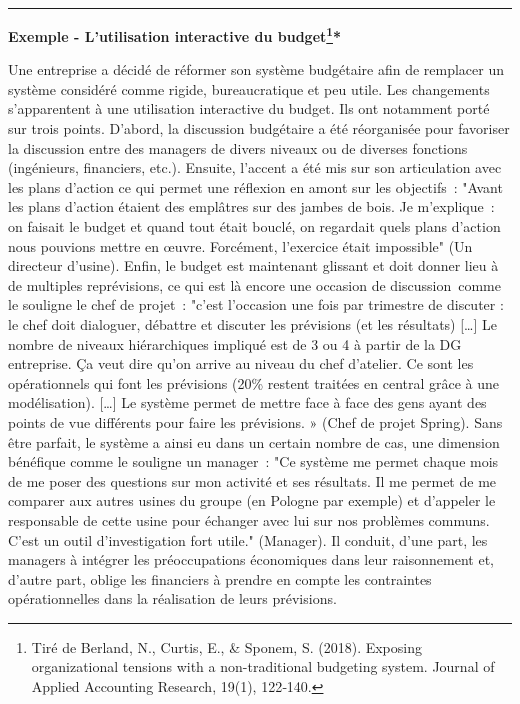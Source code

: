 \documentclass[oneside]{kaobook}
\begin{document}
\noindent\rule{\textwidth}{0.5pt}
\textbf{Exemple - L'utilisation interactive du budget\footnote{Tiré de Berland, N., Curtis, E., \& Sponem, S. (2018). Exposing organizational tensions with a non-traditional budgeting system. Journal of Applied Accounting Research, 19(1), 122‑140.}*}

Une entreprise a décidé de réformer son système budgétaire afin de remplacer un système considéré comme rigide, bureaucratique et peu utile. Les changements s'apparentent à une utilisation interactive du budget. Ils ont notamment porté sur trois points. D'abord, la discussion budgétaire a été réorganisée pour favoriser la discussion entre des managers de divers niveaux ou de diverses fonctions (ingénieurs, financiers, etc.). Ensuite, l'accent a été mis sur son articulation avec les plans d'action ce qui permet une réflexion en amont sur les objectifs : "Avant les plans d'action étaient des emplâtres sur des jambes de bois. Je m'explique : on faisait le budget et quand tout était bouclé, on regardait quels plans d'action nous pouvions mettre en œuvre. Forcément, l'exercice était impossible" (Un directeur d'usine). Enfin, le budget est maintenant glissant et doit donner lieu à de multiples reprévisions, ce qui est là encore une occasion de discussion comme le souligne le chef de projet : "c'est l'occasion une fois par trimestre de discuter : le chef doit dialoguer, débattre et discuter les prévisions (et les résultats) [\ldots{}] Le nombre de niveaux hiérarchiques impliqué est de 3 ou 4 à partir de la DG entreprise. Ça veut dire qu'on arrive au niveau du chef d'atelier. Ce sont les opérationnels qui font les prévisions (20\% restent traitées en central grâce à une modélisation). [\ldots{}] Le système permet de mettre face à face des gens ayant des points de vue différents pour faire les prévisions. » (Chef de projet Spring). Sans être parfait, le système a ainsi eu dans un certain nombre de cas, une dimension bénéfique comme le souligne un manager : "Ce système me permet chaque mois de me poser des questions sur mon activité et ses résultats. Il me permet de me comparer aux autres usines du groupe (en Pologne par exemple) et d'appeler le responsable de cette usine pour échanger avec lui sur nos problèmes communs. C'est un outil d'investigation fort utile." (Manager). Il conduit, d'une part, les managers à intégrer les préoccupations économiques dans leur raisonnement et, d'autre part, oblige les financiers à prendre en compte les contraintes opérationnelles dans la réalisation de leurs prévisions.
\end{document}
